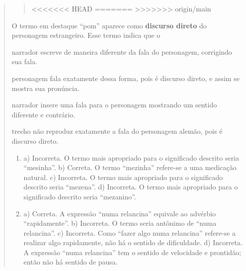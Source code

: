 \begin{quote}
\begin{quote}
<<<<<<< HEAD
=======
>>>>>>> origin/main
\end{quote}

O termo em destaque “pom” aparece como \textbf{discurso direto} do
personagem estrangeiro. Esse termo indica que o

\begin{escolha}
\item narrador escreve de maneira diferente da fala do personagem,
corrigindo sua fala.

\item personagem fala exatamente dessa forma, pois é discurso direto,
e assim se mostra sua pronúncia.

\item narrador insere uma fala para o personagem mostrando um sentido
diferente e contrário.

\item trecho não reproduz exatamente a fala do personagem alemão,
pois é discurso direto.
\end{escolha}



\begin{enumerate}
\item
a) Incorreta. O termo mais apropriado para o significado descrito seria
“mesinha”.
b) Correta. O termo “mezinha” refere-se a uma medicação natural.
c) Incorreta. O termo mais apropriado para o significado descrito seria “mezena”.
d) Incorreta. O termo mais apropriado para o significado descrito seria
“mezanino”.

\item
a) Correta. A expressão “numa relancina” equivale ao advérbio “rapidamente”.
b) Incorreta. O termo seria antônimo de “numa relancina”.
c) Incorreta. Como “fazer algo numa relancina” refere-se a realizar algo rapidamente,
não há o sentido de dificuldade.
d) Incorreta. A expressão “numa relancina” tem o sentido de velocidade e prontidão;
então não há sentido de pausa.


\end{enumerate}
\end{quote}
